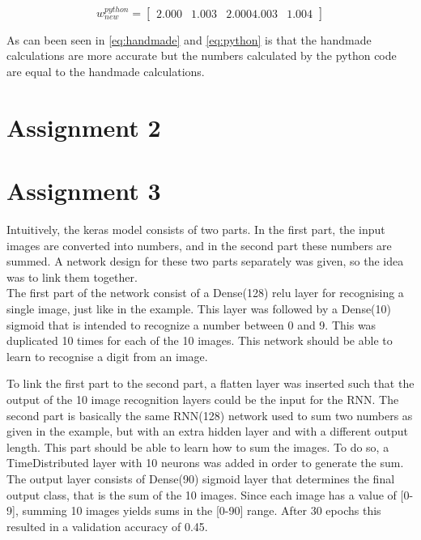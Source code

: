\documentclass[a4paper,12pt]{article}
\begin{document}
\begin{equation}
w_{new}^{python}=
\begin{bmatrix} 2.000 &   1.003 & 2.000    4.003 & 1.004
\end{bmatrix}
\label{eq:python}
\end{equation}

As can been seen in \ref{eq:handmade} and \ref{eq:python} is that the handmade calculations are more accurate but the numbers calculated by the python code are equal to the handmade calculations. 


\section{Assignment 2}


%

\section{Assignment 3}
Intuitively, the keras model consists of two parts. In the first part, the input images are converted into numbers, and in the second part these numbers are summed. A network design for these two parts separately was given, so the idea was to link them together.\\

The first part of the network consist of a Dense(128) relu layer for recognising a single image, just like in the example. This layer was followed by a Dense(10) sigmoid that is intended to recognize a number between 0 and 9. This was duplicated 10 times for each of the 10 images. This network should be able to learn to recognise a digit from an image.

To link the first part to the second part, a flatten layer was inserted such that the output of the 10 image recognition layers could be the input for the RNN. The second part is basically the same RNN(128) network used to sum two numbers as given in the example, but with an extra hidden layer and with a different output length. This part should be able to learn how to sum the images. To do so, a TimeDistributed layer with 10 neurons was added in order to generate the sum. The output layer consists of Dense(90) sigmoid layer that determines the final output class, that is the sum of the 10 images. Since each image has a value of [0-9], summing 10 images yields sums in the [0-90] range.
After 30 epochs this resulted in a validation accuracy of 0.45.\\
\end{document}
